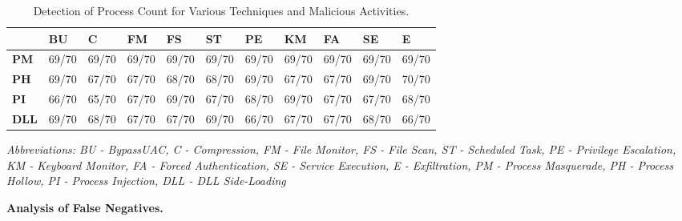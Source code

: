 \begin{table}[h!]
    \centering
    \begin{tabularx}{\textwidth}{|X|X|X|X|X|X|X|X|X|X|X|}
        \hline
        & \textbf{BU} & \textbf{C} & \textbf{FM} & \textbf{FS} & \textbf{ST} & \textbf{PE} & \textbf{KM} & \textbf{FA} & \textbf{SE} & \textbf{E} \\
        \hline
\multicolumn{1}{|l|}{\textbf{PM}} & \multicolumn{1}{l|}{69/70}   & \multicolumn{1}{l|}{69/70}  & \multicolumn{1}{l|}{69/70}   & \multicolumn{1}{l|}{69/70}   & \multicolumn{1}{l|}{69/70}   & \multicolumn{1}{l|}{69/70}   & \multicolumn{1}{l|}{69/70}   & \multicolumn{1}{l|}{69/70}   & \multicolumn{1}{l|}{69/70}   & \multicolumn{1}{l|}{69/70}  \\ \hline
\multicolumn{1}{|l|}{\textbf{PH}} & \multicolumn{1}{l|}{69/70}   & \multicolumn{1}{l|}{67/70}  & \multicolumn{1}{l|}{67/70}   & \multicolumn{1}{l|}{68/70}   & \multicolumn{1}{l|}{68/70}   & \multicolumn{1}{l|}{69/70}   & \multicolumn{1}{l|}{67/70}   & \multicolumn{1}{l|}{67/70}   & \multicolumn{1}{l|}{69/70}   & \multicolumn{1}{l|}{70/70}  \\ \hline
\multicolumn{1}{|l|}{\textbf{PI}} & \multicolumn{1}{l|}{66/70}   & \multicolumn{1}{l|}{65/70}  & \multicolumn{1}{l|}{67/70}   & \multicolumn{1}{l|}{69/70}   & \multicolumn{1}{l|}{67/70}   & \multicolumn{1}{l|}{68/70}   & \multicolumn{1}{l|}{69/70}   & \multicolumn{1}{l|}{67/70}   & \multicolumn{1}{l|}{67/70}   & \multicolumn{1}{l|}{68/70}  \\ \hline
\textbf{DLL}                      & 69/70                        & 68/70                       & 67/70                        & 67/70                        & 69/70                        & 66/70                        & 67/70                        & 67/70                        & 68/70                        & 66/70                       \\ 
        \hline
    \end{tabularx}
    \caption{Detection of Process Count for Various Techniques and Malicious Activities.}
    \smallskip
    \small \textit{Abbreviations: BU - BypassUAC, C - Compression, FM - File Monitor, FS - File Scan, ST - Scheduled Task, PE - Privilege Escalation, KM - Keyboard Monitor, FA - Forced Authentication, SE - Service Execution, E - Exfiltration, PM - Process Masquerade, PH - Process Hollow, PI - Process Injection, DLL - DLL Side-Loading}
    \label{table:eva-attack}
\end{table}
\smallskip
\noindent
{\bf Analysis of False Negatives.}
